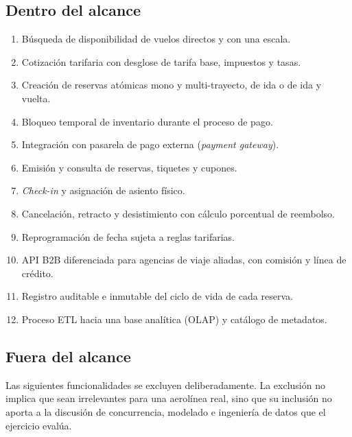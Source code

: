 \documentclass[10pt,letterpaper]{article}
\begin{document}
\subsection{Dentro del alcance}
\begin{enumerate}
  \item Búsqueda de disponibilidad de vuelos directos y con una escala.
  \item Cotización tarifaria con desglose de tarifa base, impuestos y tasas.
  \item Creación de reservas atómicas mono y multi-trayecto, de ida o de ida y vuelta.
  \item Bloqueo temporal de inventario durante el proceso de pago.
  \item Integración con pasarela de pago externa (\emph{payment gateway}).
  \item Emisión y consulta de reservas, tiquetes y cupones.
  \item \emph{Check-in} y asignación de asiento físico.
  \item Cancelación, retracto y desistimiento con cálculo porcentual de reembolso.
  \item Reprogramación de fecha sujeta a reglas tarifarias.
  \item API B2B diferenciada para agencias de viaje aliadas, con comisión y línea de crédito.
  \item Registro auditable e inmutable del ciclo de vida de cada reserva.
  \item Proceso ETL hacia una base analítica (OLAP) y catálogo de metadatos.
\end{enumerate}

\subsection{Fuera del alcance}
\label{sec:exclusiones}
Las siguientes funcionalidades se excluyen deliberadamente. La exclusión no implica que sean irrelevantes para una aerolínea real, sino que su inclusión no aporta a la discusión de concurrencia, modelado e ingeniería de datos que el ejercicio evalúa.
\end{document}
